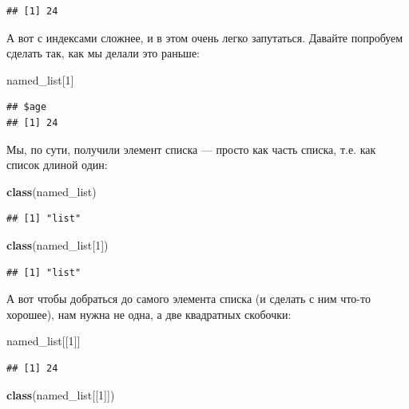 \documentclass[]{book}
\newenvironment{Shaded}{\begin{snugshade}}{\end{snugshade}}
\newcommand{\KeywordTok}[1]{\textcolor[rgb]{0.13,0.29,0.53}{\textbf{#1}}}
\newcommand{\DecValTok}[1]{\textcolor[rgb]{0.00,0.00,0.81}{#1}}
\newcommand{\NormalTok}[1]{#1}
\begin{document}
\begin{verbatim}
## [1] 24
\end{verbatim}

А вот с индексами сложнее, и в этом очень легко запутаться. Давайте
попробуем сделать так, как мы делали это раньше:

\begin{Shaded}
\begin{Highlighting}[]
\NormalTok{named_list[}\DecValTok{1}\NormalTok{]}
\end{Highlighting}
\end{Shaded}

\begin{verbatim}
## $age
## [1] 24
\end{verbatim}

Мы, по сути, получили элемент списка --- просто как часть списка, т.е.
как список длиной один:

\begin{Shaded}
\begin{Highlighting}[]
\KeywordTok{class}\NormalTok{(named_list)}
\end{Highlighting}
\end{Shaded}

\begin{verbatim}
## [1] "list"
\end{verbatim}

\begin{Shaded}
\begin{Highlighting}[]
\KeywordTok{class}\NormalTok{(named_list[}\DecValTok{1}\NormalTok{])}
\end{Highlighting}
\end{Shaded}

\begin{verbatim}
## [1] "list"
\end{verbatim}

А вот чтобы добраться до самого элемента списка (и сделать с ним что-то
хорошее), нам нужна не одна, а две квадратных скобочки:

\begin{Shaded}
\begin{Highlighting}[]
\NormalTok{named_list[[}\DecValTok{1}\NormalTok{]]}
\end{Highlighting}
\end{Shaded}

\begin{verbatim}
## [1] 24
\end{verbatim}

\begin{Shaded}
\begin{Highlighting}[]
\KeywordTok{class}\NormalTok{(named_list[[}\DecValTok{1}\NormalTok{]])}
\end{Highlighting}
\end{Shaded}
\end{document}
